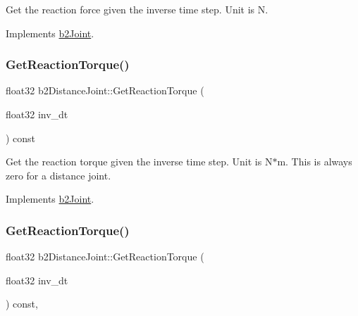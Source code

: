 Get the reaction force given the inverse time step. Unit is N. 

Implements \hyperlink{classb2Joint_a7e0eddefb9b69ad050b8ef6425838a74}{b2\+Joint}.

\mbox{\label{classb2DistanceJoint_ab62694b1ed44d3d66f19c42be94068ad}} 
\subsubsection{\texorpdfstring{Get\+Reaction\+Torque()}{GetReactionTorque()}\hspace{0.1cm}{\footnotesize\ttfamily [1/2]}}
{\footnotesize\ttfamily float32 b2\+Distance\+Joint\+::\+Get\+Reaction\+Torque (\begin{DoxyParamCaption}\item[{float32}]{inv\+\_\+dt }\end{DoxyParamCaption}) const\hspace{0.3cm}{\ttfamily [virtual]}}

Get the reaction torque given the inverse time step. Unit is N$\ast$m. This is always zero for a distance joint. 

Implements \hyperlink{classb2Joint_ae355e441c2aa842777dc04e24f15ced0}{b2\+Joint}.

\mbox{\label{classb2DistanceJoint_ad7ac78c4c20c122b944947d523a02982}} 
\subsubsection{\texorpdfstring{Get\+Reaction\+Torque()}{GetReactionTorque()}\hspace{0.1cm}{\footnotesize\ttfamily [2/2]}}
{\footnotesize\ttfamily float32 b2\+Distance\+Joint\+::\+Get\+Reaction\+Torque (\begin{DoxyParamCaption}\item[{float32}]{inv\+\_\+dt }\end{DoxyParamCaption}) const\hspace{0.3cm}{\ttfamily [override]}, {\ttfamily [virtual]}}

